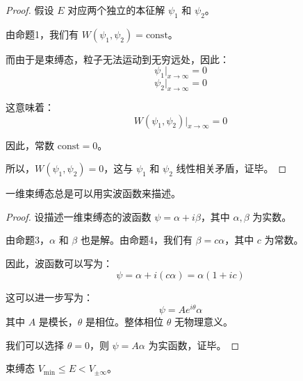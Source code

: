 \documentclass[lang=cn,10pt]{elegantbook}
\begin{document}
\begin{proof}
	假设 $E$ 对应两个独立的本征解 $\psi_1$ 和 $\psi_2$。
	
	由命题1，我们有 $W(\psi_1, \psi_2) = \text{const}$。
	
	而由于是束缚态，粒子无法运动到无穷远处，因此：
	\[
	\psi_1 \bigg|_{x \to \infty} = 0
	\]
	\[
	\psi_2 \bigg|_{x \to \infty} = 0
	\]
	
	这意味着：
	\[
	W(\psi_1, \psi_2) \bigg|_{x \to \infty} = 0
	\]
	
	因此，常数 $\text{const} = 0$。
	
	所以，$W(\psi_1, \psi_2) = 0$，这与 $\psi_1$ 和 $\psi_2$ 线性相关矛盾，证毕。
\end{proof}

\begin{proposition}
	一维束缚态总是可以用实波函数来描述。
\end{proposition}

\begin{proof}
	设描述一维束缚态的波函数 $\psi = \alpha + i\beta$，其中 $\alpha, \beta$ 为实数。
	
	由命题3，$\alpha$ 和 $\beta$ 也是解。由命题4，我们有 $\beta = c\alpha$，其中 $c$ 为常数。
	
	因此，波函数可以写为：
	\[
	\psi = \alpha + i(c\alpha) = \alpha(1 + ic)
	\]
	
	这可以进一步写为：
	\[
	\psi = A e^{i\theta}\alpha
	\]
	其中 $A$ 是模长，$\theta$ 是相位。整体相位 $\theta$ 无物理意义。
	
	我们可以选择 $\theta = 0$，则 $\psi = A\alpha$ 为实函数，证毕。
\end{proof}
\begin{proposition}
	束缚态 $V_{\text{min}} \leq E < V_{\pm\infty}$。
\end{proposition}
\end{document}
